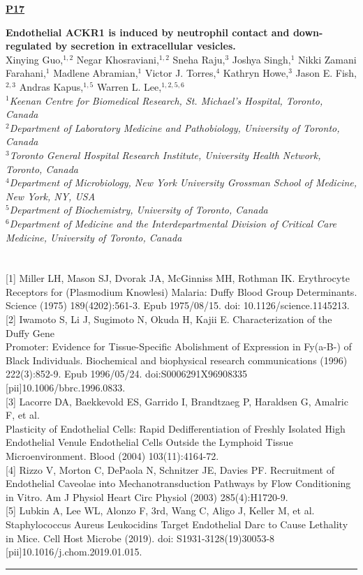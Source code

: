 \documentclass[titlepage,oneside,openany,10pt]{book}
\newenvironment{posterabswref}[5] %
        {
        \newcommand{\posterref}{#5}
	\begin{flushright}
                \underline{\textbf{#4}}
        \end{flushright}
        \textbf{#1}\\%
        #2\\%
        \textit{#3}\\\\%
        }
        {
        \vspace{0.5cm}
        \\\noindent \posterref \\ \noindent\rule{15cm}{0.5pt}%
        }
\begin{document}
\begin{posterabswref}
	{Endothelial ACKR1 is induced by neutrophil contact and down-regulated by secretion in extracellular vesicles.}
	{Xinying Guo,$^{1,2}$ Negar Khosraviani,$^{1,2}$ Sneha Raju,$^{3}$ Joshya Singh,$^{1}$ Nikki Zamani Farahani,$^{1}$ Madlene Abramian,$^{1}$ Victor J. Torres,$^{4}$ Kathryn Howe,$^{3}$ Jason E. Fish,$^{2,3}$ Andras Kapus,$^{1,5}$ Warren L. Lee,$^{1,2,5,6}$}
	{
	$^1$Keenan Centre for Biomedical Research, St. Michael's Hospital, Toronto, Canada\\
	$^2$Department of Laboratory Medicine and Pathobiology, University of Toronto, Canada\\
	$^3$Toronto General Hospital Research Institute, University Health Network, Toronto, Canada\\
	$^4$Department of Microbiology, New York University Grossman School of Medicine, New York, NY, USA\\
	$^5$Department of Biochemistry, University of Toronto, Canada\\
	$^6$Department of Medicine and the Interdepartmental Division of Critical Care Medicine, University of Toronto, Canada
	}
	{P17}
	{
	{[1]} Miller LH, Mason SJ, Dvorak JA, McGinniss MH, Rothman IK. Erythrocyte Receptors for (Plasmodium Knowlesi) Malaria: Duffy Blood Group Determinants. Science (1975) 189(4202):561-3. Epub 1975/08/15. doi: 10.1126/science.1145213.\\
	{[2]} Iwamoto S, Li J, Sugimoto N, Okuda H, Kajii E. Characterization of the Duffy Gene\\Promoter: Evidence for Tissue-Specific Abolishment of Expression in Fy(a-B-) of Black Individuals. Biochemical and biophysical research communications (1996) 222(3):852-9. Epub 1996/05/24. doi:S0006291X96908335 {[}pii{]}10.1006/bbrc.1996.0833.\\
	{[3]} Lacorre DA, Baekkevold ES, Garrido I, Brandtzaeg P, Haraldsen G, Amalric F, et al.\\Plasticity of Endothelial Cells: Rapid Dedifferentiation of Freshly Isolated High Endothelial Venule Endothelial Cells Outside the Lymphoid Tissue Microenvironment. Blood (2004) 103(11):4164-72.\\
	{[4]} Rizzo V, Morton C, DePaola N, Schnitzer JE, Davies PF. Recruitment of Endothelial Caveolae into Mechanotransduction Pathways by Flow Conditioning in Vitro. Am J Physiol Heart Circ Physiol (2003) 285(4):H1720-9.\\
	{[5]} Lubkin A, Lee WL, Alonzo F, 3rd, Wang C, Aligo J, Keller M, et al. Staphylococcus Aureus Leukocidins Target Endothelial Darc to Cause Lethality in Mice. Cell Host Microbe (2019). doi: S1931-3128(19)30053-8 {[}pii{]}10.1016/j.chom.2019.01.015.
}
\end{posterabswref}
\end{document}
